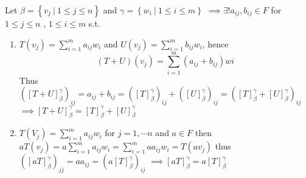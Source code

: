 Let $\beta = \left\{v_j \ |\ 1 \leq j\leq n \right\} $ and $\gamma = \left\{ w_i\ |\ 1\leq i\leq m \right \} $ $\implies\exists ! a_{ij} , b_{ij} \in F$ for $1\leq j \leq n $ , $1\leq i \leq m$ s.t. 

\begin{enumerate}
	\item $T(v_j) = \sum_{i = 1}^m a_{ij}w_i$ and $U(v_{j}) = \sum_{i = 1}^m b_{ij} w_i $, hence 
	$$\left(T+ U \right)(v_j) = \sum_{i=1}^m(a_{ij} + b_
		{ij})wi $$
	Thus $\left([T+U]_{\beta}^{\gamma}\right)_{i j}=a_{i j}+b_{i j}=\left([T]_{\beta}^{\gamma}\right)_{i j}+\left([U]_{\beta}^{\gamma}\right)_{i j}=\left([T]_{\beta}^{\gamma}+[U]_{\beta}^{\gamma}\right)_{i j}$
$\implies [T+U]_{\beta}^{\gamma}=[T]_{\beta}^{\gamma}+[U]_{\beta}^{\gamma}$
	\item $T\left(V_{j}\right)=\sum_{i=1}^{m} a_{i j} w_{i}$ for $j=1 , \cdots n $ and $ a \in F$ then
$ a T\left(v_{j}\right) = a \sum_{i=1}^{m} a_{i j} w_{i}=\sum_{i=1}^{m} a a_{i j} w_{i} = T\left(a v_{j} \right)$
thus
$\left([a T]_{\beta}^{\gamma}\right)_{j j}=a a_{i j}=\left(a[T]_{\beta}^{\gamma}\right)_{i j}$
$\implies [a T]_{\beta}^{\gamma} = a[T]_{\beta}^{\gamma}$

\end{enumerate} 